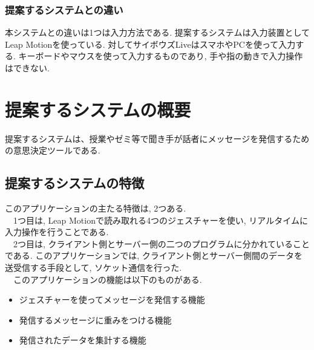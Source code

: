 \documentclass{funthesis}
\begin{document}
\subsection{提案するシステムとの違い}
本システムとの違いは1つは入力方法である. 提案するシステムは入力装置としてLeap Motionを使っている. 対してサイボウズLiveはスマホやPCを使って入力する. キーボードやマウスを使って入力するものであり, 手や指の動きで入力操作はできない. 

\chapter{提案するシステムの概要}

提案するシステムは、授業やゼミ等で聞き手が話者にメッセージを発信するための意思決定ツールである. 

\section{提案するシステムの特徴}


このアプリケーションの主たる特徴は, 2つある.\\
　1つ目は, Leap Motionで読み取れる4つのジェスチャーを使い, リアルタイムに入力操作を行うことである. \\
　2つ目は, クライアント側とサーバー側の二つのプログラムに分かれていることである. このアプリケーションでは, クライアント側とサーバー側間のデータを送受信する手段として, ソケット通信を行った. \\
　このアプリケーションの機能は以下のものがある.
\begin{itemize}
 \item ジェスチャーを使ってメッセージを発信する機能
 \item 発信するメッセージに重みをつける機能
 \item 発信されたデータを集計する機能
\end{itemize}
\end{document}
